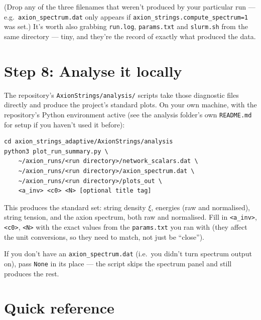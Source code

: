 \documentclass[11pt]{article}
\begin{document}
(Drop any of the three filenames that weren't produced by your particular run --- e.g.\
\texttt{axion\_spectrum.dat} only appears if \texttt{axion\_strings.compute\_spectrum=1} was set.) It's
worth also grabbing \texttt{run.log}, \texttt{params.txt} and \texttt{slurm.sh} from the same directory ---
tiny, and they're the record of exactly what produced the data.

\section{Step 8: Analyse it locally}
\label{sec:analyse-locally}

The repository's \texttt{AxionStrings/analysis/} scripts take those diagnostic files directly and produce
the project's standard plots. On your own machine, with the repository's Python environment active
(see the analysis folder's own \texttt{README.md} for setup if you haven't used it before):

\begin{lstlisting}
cd axion_strings_adaptive/AxionStrings/analysis
python3 plot_run_summary.py \
    ~/axion_runs/<run directory>/network_scalars.dat \
    ~/axion_runs/<run directory>/axion_spectrum.dat \
    ~/axion_runs/<run directory>/plots_out \
    <a_inv> <c0> <N> [optional title tag]
\end{lstlisting}

This produces the standard set: string density $\xi$, energies (raw and normalised), string tension, and
the axion spectrum, both raw and normalised. Fill in \texttt{<a\_inv>}, \texttt{<c0>}, \texttt{<N>} with the
exact values from the \texttt{params.txt} you ran with (they affect the unit conversions, so they need to
match, not just be ``close'').

If you don't have an \texttt{axion\_spectrum.dat} (i.e.\ you didn't turn spectrum output on), pass
\texttt{None} in its place --- the script skips the spectrum panel and still produces the rest.

\section{Quick reference}
\end{document}

